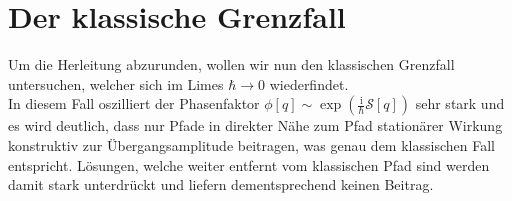 \section{Der klassische Grenzfall}
Um die Herleitung abzurunden, wollen wir nun den klassischen Grenzfall untersuchen, welcher sich im Limes $\hbar\rightarrow 0$ wiederfindet. \\
In diesem Fall oszilliert der Phasenfaktor $\phi[q] \sim \exp(\frac{\mathrm{i}}{\hbar} \mathcal{S}[q])$ sehr stark und es wird deutlich, dass nur Pfade in direkter Nähe zum Pfad stationärer Wirkung konstruktiv zur Übergangsamplitude beitragen, was genau dem klassischen Fall entspricht. Lösungen, welche weiter entfernt vom klassischen Pfad sind werden damit stark unterdrückt und liefern dementsprechend keinen Beitrag.  